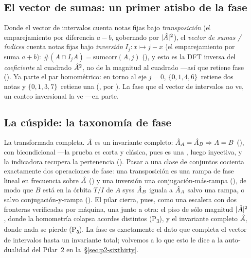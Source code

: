 \subsection{El vector de sumas: un primer atisbo de la fase}\label{sec:p1-sum}


Donde el vector de intervalos cuenta notas fijas bajo \emph{transposición} (el emparejamiento por
diferencia $a-b$, gobernado por $|\hat{A}|^2$), el \emph{vector de sumas / índices} cuenta notas fijas bajo
\emph{inversión} $I_j:x\mapsto j-x$ (el emparejamiento por suma $a+b$): $\#(A\cap I_jA)=\mathrm{sumcorr}(A,j)$
(), y esto es la DFT inversa del \emph{coeficiente} al cuadrado $\hat{A}^2$,
no de la magnitud al cuadrado ---así que retiene fase (). Ya parte el par
homométrico: en torno al eje $j=0$, $\{0,1,4,6\}$\, retiene dos notas y
$\{0,1,3,7\}$\, retiene una (, por
). La fase que el vector de intervalos no ve, un conteo inversional la ve ---en parte.

\subsection{La cúspide: la taxonomía de fase}\label{sec:p1-capstone}


La transformada completa. $\hat{A}$ es un invariante completo: $\hat{A}_A=\hat{A}_B\Rightarrow A=B$
(), con bicondicional  ---la prueba es corta y clásica, pues
 es una , luego inyectiva, y la indicadora recupera la pertenencia
(). Pasar a una clase de conjuntos cocienta exactamente dos operaciones de fase: una
transposición es una rampa de fase lineal en frecuencia sobre $\hat{A}$ () y una
inversión una conjugación-más-rampa (), de modo que $B$ está en la órbita
$T/I$ de $A$ syss $\hat{A}_B$ iguala a $\hat{A}_A$ salvo una rampa, o salvo conjugación-y-rampa
(). El pilar cierra, pues, como una escalera con dos fronteras
verificadas por máquina, una junto a otra: el piso de sólo magnitud $|\hat{A}|^2$, donde la homometría
colapsa acordes distintos (P\textsubscript{3}), y el invariante completo $\hat{A}$, donde nada se pierde
(P\textsubscript{5}). La fase es exactamente el dato que completa el vector de intervalos hasta un
invariante total; volvemos a lo que esto le dice a la auto-dualidad del Pilar~2 en
la~\S\ref{sec:p2-sixthirty}.

